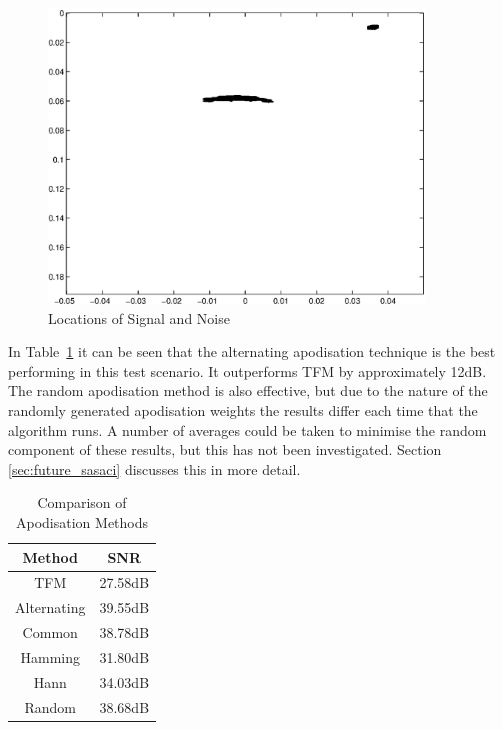 \begin{figure}[htb]
\centering
		\includegraphics[width=100mm]{noise.eps}
		\caption{Locations of Signal and Noise}
		\label{fig:snr_result}
\end{figure}

	
In Table~\ref{table:apod_methods} it can be seen that the alternating apodisation technique is the best performing in this test scenario. It outperforms TFM by approximately 12dB. The random apodisation method is also effective, but due to the nature of the randomly generated apodisation weights the results differ each time that the algorithm runs. A number of averages could be taken to minimise the random component of these results, but this has not been investigated. Section \ref{sec:future_sasaci} discusses this in more detail.

\begin{table}[ht!]
\begin{center}
	\begin{tabular}{| c | c |}
	\hline 
	\textbf{Method} & \textbf{SNR} \\ \hline \hline 
	TFM	& 27.58dB \\ \hline
	Alternating & 39.55dB \\ \hline
	Common & 38.78dB \\ \hline
	Hamming & 31.80dB \\ \hline
	Hann & 34.03dB \\ \hline
	Random & 38.68dB \\ \hline
	\end{tabular}
	\caption{Comparison of Apodisation Methods}
	\label{table:apod_methods}
	\end{center}
	\end{table}
	
